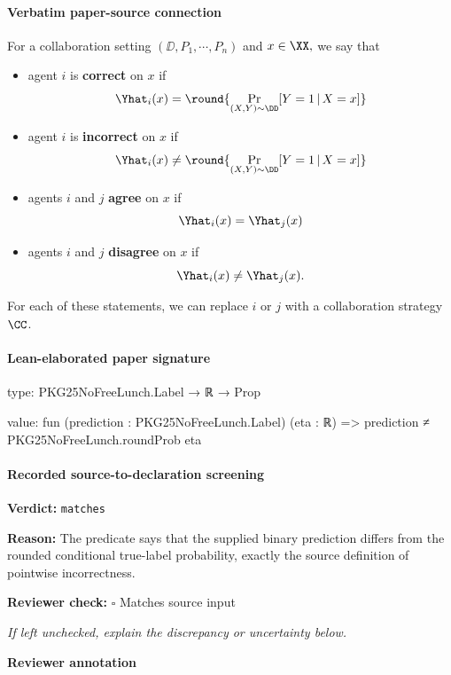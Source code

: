\documentclass[10pt]{article}
\newcommand{\reviewerbox}{%
  \par\noindent\fbox{\parbox{0.96\linewidth}{\rule{0pt}{0.38in}}}\par
}
\newcommand{\reviewmatch}[1]{%
  \par\noindent\textbf{Reviewer check:} $\square$\; #1\par
  \noindent\emph{If left unchecked, explain the discrepancy or uncertainty below.}\par
}
\begin{document}
\paragraph{Verbatim paper-source connection}
\begin{ReviewVerbatim}
\begin{definition}\label{def:correct}
For a collaboration setting $(\DD, P_1,\cdots,P_n)$ and $x\in \XX,$ we say that
\begin{itemize}
    \item agent $i$ is \textbf{correct} on $x$ if $$\Yhat_i(x) = \round{\Pr_{(X,Y)\sim \DD}[Y=1\,|\,X=x]}$$
    \item agent $i$ is \textbf{incorrect} on $x$ if $$\Yhat_i(x) \neq \round{\Pr_{(X,Y)\sim \DD}[Y=1\,|\,X=x]}$$
    \item agents $i$ and $j$ \textbf{agree} on $x$ if $$\Yhat_i(x) = \Yhat_j(x)$$
    \item agents $i$ and $j$ \textbf{disagree} on $x$ if $$\Yhat_i(x) \neq \Yhat_j(x).$$
\end{itemize}
For each of these statements, we can replace $i$ or $j$ with a collaboration strategy $\CC$.
\end{definition}
\end{ReviewVerbatim}



\paragraph{Lean-elaborated paper signature}
\begin{ReviewVerbatim}
type:
PKG25NoFreeLunch.Label → ℝ → Prop

value:
fun (prediction : PKG25NoFreeLunch.Label) (eta : ℝ) => prediction ≠ PKG25NoFreeLunch.roundProb eta
\end{ReviewVerbatim}


\paragraph{Recorded source-to-declaration screening}
\textbf{Verdict:} \texttt{matches}
\\
{\raggedright
\textbf{Reason:} The predicate says that the supplied binary prediction differs from the rounded conditional true-\allowbreak{}label probability, exactly the source definition of pointwise incorrectness.\allowbreak{}
\par}
\reviewmatch{Matches source input}
\noindent\textbf{Reviewer annotation}\par
\reviewerbox
\end{document}
